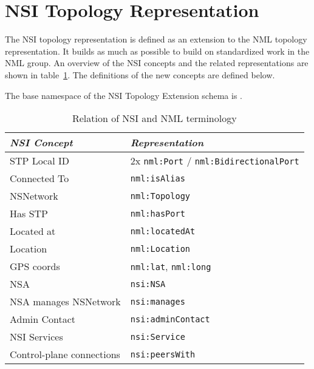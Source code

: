 \documentclass[12pt]{article}  %
\begin{document}


\section{NSI Topology Representation} %
\label{sec:nsi_topology_representation}

 The NSI topology representation is defined as an extension to the NML topology 
representation. It builds as much as possible to build on standardized work in the NML group.
An overview of the NSI concepts and the related representations are shown in table~\ref{tab:nsi-nml}.
The definitions of the new concepts are defined below.

The base namespace of the NSI Topology Extension schema is .

\begin{table}
\begin{center}

  \begin{tabular}{|l|l|}
\hline
     \textit{NSI Concept} &                               \textit{Representation}\\
\hline
             STP Local ID & 2x \texttt{nml:Port} / \texttt{nml:BidirectionalPort}\\
\hline
             Connected To &                                  \texttt{nml:isAlias}\\
\hline
                NSNetwork &                                 \texttt{nml:Topology}\\
\hline
                  Has STP &                                  \texttt{nml:hasPort}\\
\hline
               Located at &                                \texttt{nml:locatedAt}\\
\hline
                 Location &                                 \texttt{nml:Location}\\
\hline
               GPS coords &                   \texttt{nml:lat}, \texttt{nml:long}\\
\hline
                      NSA &                                      \texttt{nsi:NSA}\\
\hline
    NSA manages NSNetwork &                                  \texttt{nsi:manages}\\
\hline
            Admin Contact &                             \texttt{nsi:adminContact}\\
\hline
             NSI Services &                                  \texttt{nsi:Service}\\
\hline
Control-plane connections &                                \texttt{nsi:peersWith}\\
\hline
\end{tabular}
\caption{Relation of NSI and NML terminology}\label{tab:nsi-nml}
  \end{center}
\end{table}
\end{document}
